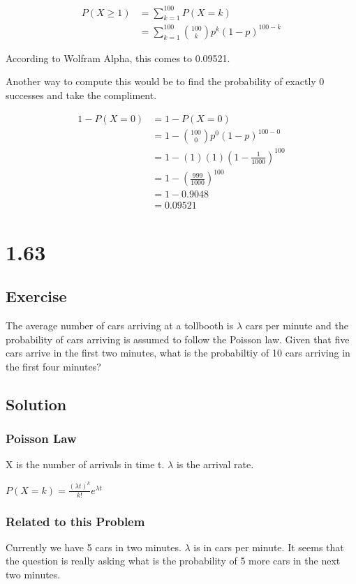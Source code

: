 \documentclass[12pt]{article}
\begin{document}
\begin{align*}
P(X\geq1) &=\sum_{k=1}^{100}P(X=k)\\
&=\sum_{k=1}^{100}\binom{100}{k}p^k(1-p)^{100-k}
\end{align*}

According to Wolfram Alpha, this comes to 0.09521.

Another way to compute this would be to find the probability of exactly 0 successes and take the compliment.

\begin{align*}
1-P(X=0) &=1-P(X=0)\\
&=1-\binom{100}{0}p^0(1-p)^{100-0}\\
&=1-(1)(1)(1-\frac{1}{1000})^{100}\\
&=1-(\frac{999}{1000})^{100}\\
&=1-0.9048\\
&=0.09521
\end{align*}




\section{1.63}
\subsection{Exercise}
The average number of cars arriving at a tollbooth is $\lambda$ cars per minute and the probability of cars arriving 
is assumed to follow the Poisson law. Given that five cars arrive in the first two minutes, what is the probabiltiy of 10
cars arriving in the first four minutes?

\subsection{Solution}
\subsubsection{Poisson Law}
X is the number of arrivals in time  t. $\lambda$ is the arrival rate.

$P(X=k) = \frac{(\lambda t)^k}{k!}e^{\lambda t}$

\subsubsection{Related to this Problem}
Currently we have 5 cars in two minutes. $\lambda$ is in cars per minute. It seems that the question is really asking
what is the probability of 5 more cars in the next two minutes.
\end{document}
